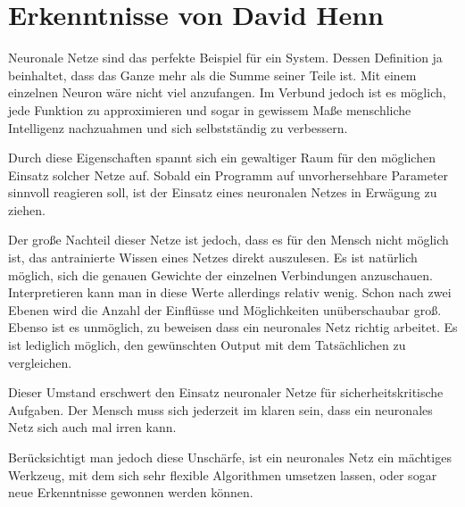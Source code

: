 \section{Erkenntnisse von David Henn}
Neuronale Netze sind das perfekte Beispiel für ein System. Dessen Definition ja beinhaltet, dass das Ganze mehr als die Summe seiner Teile ist. Mit einem einzelnen Neuron wäre nicht viel anzufangen. Im Verbund jedoch ist es möglich, jede Funktion zu approximieren und sogar in gewissem Maße menschliche Intelligenz nachzuahmen und sich selbstständig zu verbessern.

Durch diese Eigenschaften spannt sich ein gewaltiger Raum für den möglichen Einsatz solcher Netze auf. Sobald ein Programm auf unvorhersehbare Parameter sinnvoll reagieren soll, ist der Einsatz eines neuronalen Netzes in Erwägung zu ziehen.

Der große Nachteil dieser Netze ist jedoch, dass es für den Mensch nicht möglich ist, das antrainierte Wissen eines Netzes direkt auszulesen. Es ist natürlich möglich, sich die genauen Gewichte der einzelnen Verbindungen anzuschauen. Interpretieren kann man in diese Werte allerdings relativ wenig. Schon nach zwei Ebenen wird die Anzahl der Einflüsse und Möglichkeiten unüberschaubar groß. Ebenso ist es unmöglich, zu beweisen dass ein neuronales Netz richtig arbeitet. Es ist lediglich möglich, den gewünschten Output mit dem Tatsächlichen zu vergleichen.

Dieser Umstand erschwert den Einsatz neuronaler Netze für sicherheitskritische Aufgaben. Der Mensch muss sich jederzeit im klaren sein, dass ein neuronales Netz sich auch mal irren kann.

Berücksichtigt man jedoch diese Unschärfe, ist ein neuronales Netz ein mächtiges Werkzeug, mit dem sich sehr flexible Algorithmen umsetzen lassen, oder sogar neue Erkenntnisse gewonnen werden können.